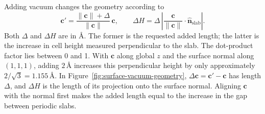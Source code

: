Adding vacuum changes the geometry according to
\begin{equation}
  \mathbf c'=
  \frac{\|\mathbf c\|+\Delta}{\|\mathbf c\|}\,\mathbf c,
  \qquad
  \Delta H=\Delta\,
  \left|\frac{\mathbf c}{\|\mathbf c\|}\cdot\hat{\mathbf n}_{\mathrm{slab}}\right|.
  \label{eq:vacuum-addition-projection}
\end{equation}
Both $\Delta$ and $\Delta H$ are in \AA. The former is the requested added length; the latter is the increase in cell height measured perpendicular to the slab. The dot-product factor lies between 0 and 1. With $\mathbf c$ along global $z$ and the surface normal along $(1,1,1)$, adding $2\,\text{\AA}$ increases this perpendicular height by only approximately $2/\sqrt{3}=1.155\,\text{\AA}$. In Figure~\ref{fig:surface-vacuum-geometry}, $\Delta\mathbf c=\mathbf c'-\mathbf c$ has length $\Delta$, and $\Delta H$ is the length of its projection onto the surface normal. Aligning $\mathbf c$ with the normal first makes the added length equal to the increase in the gap between periodic slabs.
